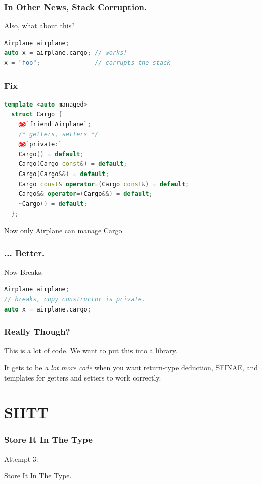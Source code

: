 \documentclass{beamer}
\newcommand{\nl}{\vspace{0.2\baselineskip}}
\newcommand{\HT}{{\Huge T}{\hspace{-5pt}}}
\newcommand{\HI}{{\Huge I}{\hspace{-1pt}}}
\newcommand{\HS}{{\Huge S}{\hspace{-1pt}}}
\begin{document}
\begin{frame}[fragile]
\frametitle{In Other News, Stack Corruption.}
\begin{center}
  Also, what about this?
\end{center}

\begin{lstlisting}[language=cpp]
Airplane airplane;
auto x = airplane.cargo; // works!
x = "foo";               // corrupts the stack
\end{lstlisting}
\end{frame}


\begin{frame}[fragile]
\frametitle{Fix}
\begin{lstlisting}[language=cpp]
  template <auto managed>
  struct Cargo {
    @@`friend Airplane`;
    /* getters, setters */
    @@`private:`
    Cargo() = default;
    Cargo(Cargo const&) = default;
    Cargo(Cargo&&) = default;
    Cargo const& operator=(Cargo const&) = default;
    Cargo&& operator=(Cargo&&) = default;
    ~Cargo() = default;
  };
\end{lstlisting}
\begin{center}
  Now only Airplane can manage Cargo.
\end{center}
\end{frame}


\begin{frame}[fragile]
\frametitle{... Better.}
\begin{center}
  Now Breaks:
\end{center}

\begin{lstlisting}[language=cpp]
Airplane airplane;
// breaks, copy constructor is private.
auto x = airplane.cargo;
\end{lstlisting}
\end{frame}


\begin{frame}[fragile]
\frametitle{Really Though?}
\begin{center}
  This is a lot of code. We want to put this into a library.\nl \nl \nl \nl

  It gets to be \emph{a lot more code} when you want return-type deduction,
  SFINAE, and templates for getters and setters to work correctly.
\end{center}
\end{frame}

\section{SIITT}
\begin{frame}[fragile]
\frametitle{Store It In The Type}
\begin{center}
  Attempt 3:\nl\nl

  \HS tore \HI t \HI n \HT he \HT ype.
\end{center}
\end{frame}
\end{document}
